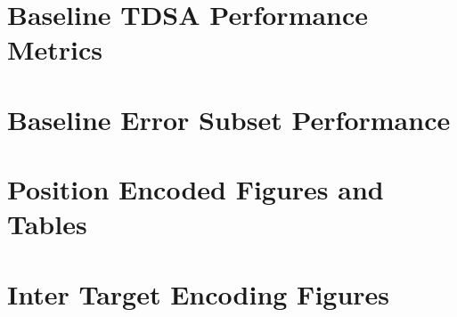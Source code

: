 \documentclass[11pt]{report}
\begin{document}
\section{Baseline TDSA Performance Metrics}
\label{section:appendix_tdsa_baseline_metrics}

\section{Baseline Error Subset Performance}
\label{section:appendix_baseline_error_subset_performance}

\section{Position Encoded Figures and Tables}
\label{section:appendix_position_encoded_figures_and_tables}

\section{Inter Target Encoding Figures}
\label{section:appendix_inter_target_encoding_figures_and_tables}




\printbibliography
\end{document}
